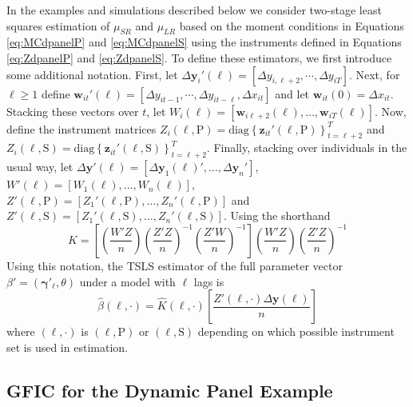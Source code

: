 In the examples and simulations described below we consider two-stage least squares estimation of $\mu_{SR}$ and $\mu_{LR}$ based on the moment conditions in Equations \ref{eq:MCdpanelP} and \ref{eq:MCdpanelS} using the instruments defined in Equations \ref{eq:ZdpanelP} and \ref{eq:ZdpanelS}.
To define these estimators, we first introduce some additional notation.
First, let $\Delta \mathbf{y}_{i}'(\ell) = [\Delta y_{i,\ell+2}, \cdots, \Delta y_{iT}]$.
Next, for $\ell \geq 1$ define $\mathbf{w}_{it}'(\ell) = [\Delta y_{it-1}, \cdots, \Delta y_{it-\ell}, \Delta x_{it}]$ and let $\mathbf{w}_{it}(0) = \Delta x_{it}$.
Stacking these vectors over $t$, let $W_i(\ell) = [\mathbf{w}_{i\ell+2}(\ell), \hdots, \mathbf{w}_{iT}(\ell)]$.
Now, define the instrument matrices $Z_i(\ell,\mbox{P}) = \mbox{diag}\left\{ \mathbf{z}_{it}'(\ell,\mbox{P}) \right\}_{t=\ell+2}^T$ and $Z_i(\ell,\mbox{S}) = \mbox{diag}\left\{ \mathbf{z}_{it}'(\ell,\mbox{S}) \right\}_{t=\ell+2}^T$.
Finally, stacking over individuals in the usual way, let $\Delta \mathbf{y}'(\ell) = [\Delta \mathbf{y}_1(\ell)', \hdots, \Delta \mathbf{y}_n']$,  $W'(\ell) = [W_1(\ell),\hdots, W_n(\ell)]$, $Z'(\ell,\mbox{P}) = \left[ Z_1'(\ell, \mbox{P}), \hdots, Z_n'(\ell,\mbox{P})\right]$ and $Z'(\ell,\mbox{S}) = \left[ Z_1'(\ell, \mbox{S}), \hdots, Z_n'(\ell,\mbox{S})\right]$.
Using the shorthand
\begin{equation}
  \widehat{K}= \left[ \left( \frac{W'Z}{n} \right)\left( \frac{Z'Z}{n} \right)^{-1}\left( \frac{Z'W}{n} \right)^{-1} \right]\left( \frac{W'Z}{n} \right)\left( \frac{Z'Z}{n} \right)^{-1}
\end{equation}
Using this notation, the TSLS estimator of the full parameter vector $\beta' = (\boldsymbol{\gamma}'_\ell, \theta)$ under a model with $\ell$ lags is
\begin{equation}
  \widehat{\beta}\left( \ell,\cdot \right) = \widehat{K}(\ell, \cdot) \left[ \frac{Z'(\ell,\cdot)\Delta \mathbf{y}(\ell)}{n} \right]
\end{equation}
where $(\ell, \cdot)$ is $(\ell, \mbox{P})$ or $(\ell, \mbox{S})$ depending on which possible instrument set is used in estimation.

\subsection{GFIC for the Dynamic Panel Example}

